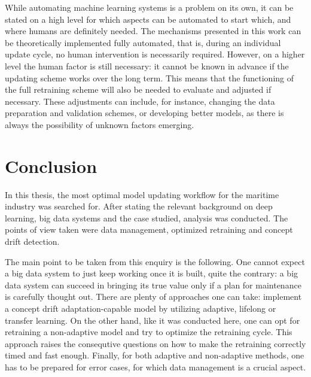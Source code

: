 While automating machine learning systems is a problem on its own, it can be stated on a high level for which aspects can be automated to start which, and where humans are definitely needed. The mechanisms presented in this work can be theoretically implemented fully automated, that is, during an individual update cycle, no human intervention is necessarily required. However, on a higher level the human factor is still necessary: it cannot be known in advance if the updating scheme works over the long term. This means that the functioning of the full retraining scheme will also be needed to evaluate and adjusted if necessary. These adjustments can include, for instance, changing the data preparation and validation schemes, or developing better models, as there is always the possibility of unknown factors emerging.


\chapter{Conclusion}

In this thesis, the most optimal model updating workflow for the maritime industry was searched for. After stating the relevant background on deep learning, big data systems and the case studied, analysis was conducted. The points of view taken were data management, optimized retraining and concept drift detection.

The main point to be taken from this enquiry is the following. One cannot expect a big data system to just keep working once it is built, quite the contrary: a big data system can succeed in bringing its true value only if a plan for maintenance is carefully thought out. There are plenty of approaches one can take: implement a concept drift adaptation-capable model by utilizing adaptive, lifelong or transfer learning. On the other hand, like it was conducted here, one can opt for retraining a non-adaptive model and try to optimize the retraining cycle. This approach raises the consequtive questions on how to make the retraining correctly timed and fast enough. Finally, for both adaptive and non-adaptive methods, one has to be prepared for error cases, for which data management is a crucial aspect.

